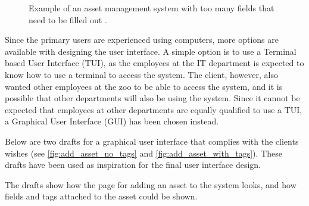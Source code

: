 \begin{figure}[H]
    \centering
    \caption{Example of an asset management system with too many fields that need to be filled out \citep{SnipeIT}.}
    \label{fig:too-many-fields}
\end{figure}

Since the primary users are experienced using computers, more options are available with designing the user interface. A simple option is to use a Terminal based User Interface (TUI), as the employees at the IT department is expected to know how to use a terminal to access the system. The client, however, also wanted other employees at the zoo to be able to access the system, and it is possible that other departments will also be using the system. Since it cannot be expected that employees at other departments are equally qualified to use a TUI, a Graphical User Interface (GUI) has been chosen instead. 
\par
Below are two drafts for a graphical user interface that complies with the clients wishes (see \autoref{fig:add_asset_no_tags} and \autoref{fig:add_asset_with_tags}). These drafts have been used as inspiration for the final user interface design.
\par
The drafts show how the page for adding an asset to the system looks, and how fields and tags attached to the asset could be shown.

